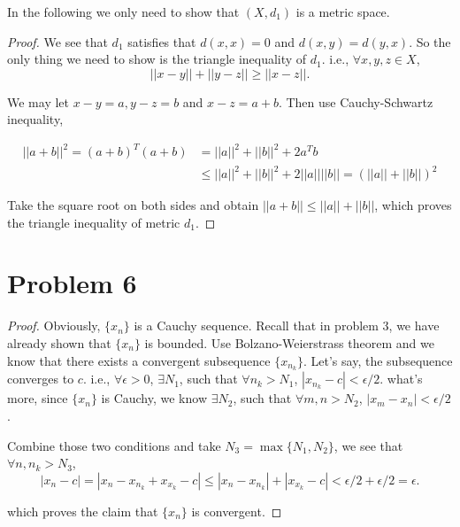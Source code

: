\documentclass[12pt]{article}
\begin{document}
In the following we only need to show that $(X, d_1)$ is a metric space.
\begin{proof}
We see that $d_1$ satisfies that $d(x, x) = 0$ and $d(x, y) = d(y, x)$. So the only thing we need to show is the triangle inequality of $d_1$. i.e., $\forall x, y, z \in X$, 
$$
||x- y|| + ||y - z|| \geqslant ||x - z||.
$$

We may let $x - y = a,  y - z = b$ and $ x - z = a + b$. Then use Cauchy-Schwartz inequality,

$$
\begin{aligned}
||a + b||^2 = (a + b)^T(a + b) & = ||a||^2 + ||b||^2 + 2a^Tb \\
& \leqslant ||a||^2 + ||b||^2 + 2 ||a||||b|| = (||a||+||b||)^2
\end{aligned}
$$

Take the square root on both sides and obtain $||a+b|| \leqslant ||a|| + ||b||$, which proves the triangle inequality of metric $d_1$.

\end{proof}

\section*{Problem 6}
\begin{proof}

Obviously, $\{x_n\}$ is a Cauchy sequence. Recall that in problem 3, we have already shown that $\{x_n\}$ is bounded. Use Bolzano-Weierstrass theorem and we know that there exists a  convergent subsequence $\{x_{n_k}\}$. Let's say, the subsequence converges to $c$. i.e., $\forall \epsilon > 0$, $\exists N_1$, such that $\forall n_k > N_1$, $|x_{n_k} - c| < \epsilon/2$. what's more, since $\{x_n\}$ is Cauchy, we know $\exists N_2$, such that $\forall m, n > N_2$, $|x_m - x_n|< \epsilon/2$.

Combine those two conditions and take $N_3 = \max\{N_1, N_2\}$, we see that $\forall n, n_k > N_3$,
$$
|x_n - c| = |x_n - x_{n_k} + x_{x_k} - c| \leqslant |x_n - x_{n_k}| + |x_{x_k} - c| < \epsilon/2 + \epsilon/2 = \epsilon.
$$

which proves the claim that $\{x_n\}$ is convergent.

\end{proof}
\end{document}
